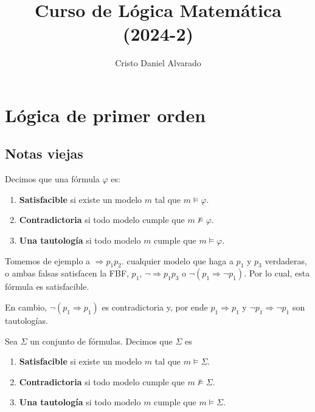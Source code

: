 \documentclass[12pt]{report}
\newcounter{it}
\theoremstyle{largebreak}
\begin{document}
    \title{Curso de Lógica Matemática (2024-2)}
    \author{Cristo Daniel Alvarado}
    \maketitle

    \tableofcontents %

    \newpage

    \setcounter{chapter}{0} %

    \chapter{Lógica de primer orden}

    \section{Notas viejas}
    
    \begin{mydef}
        Decimos que una fórmula $\varphi$ es:
        \begin{enumerate}
            \item \textbf{Satisfacible} si existe un modelo $m$ tal que $m\vDash\varphi$.
            \item \textbf{Contradictoria} si todo modelo cumple que $m\nvDash\varphi$.
            \item \textbf{Una tautología} si todo modelo $m$ cumple que $m\vDash\varphi$.
        \end{enumerate}
    \end{mydef}

    \begin{exa}
        Tomemos de ejemplo a $\Rightarrow p_1 p_2$. cualquier modelo que haga a $p_1$ y $p_3$ verdaderas, o ambas falsas satisfacen la FBF, $p_1$, $\neg\Rightarrow p_1 p_3$ o $\neg(p_1\Rightarrow\neg p_1)$. Por lo cual, esta fórmula es satisfacible.

        En cambio, $\neg(p_1\Rightarrow p_1)$ es contradictoria y, por ende $p_1\Rightarrow p_1$ y $\neg p_1\Rightarrow\neg p_1$ son tautologías.
    \end{exa}

    \begin{mydef}
        Sea $\Sigma$ un conjunto de fórmulas. Decimos que $\Sigma$ es
        \begin{enumerate}
            \item \textbf{Satisfacible} si existe un modelo $m$ tal que $m\vDash\Sigma$.
            \item \textbf{Contradictoria} si todo modelo cumple que $m\nvDash\Sigma$.
            \item \textbf{Una tautología} si todo modelo $m$ cumple que $m\vDash\Sigma$.
        \end{enumerate}
    \end{mydef}
\end{document}
